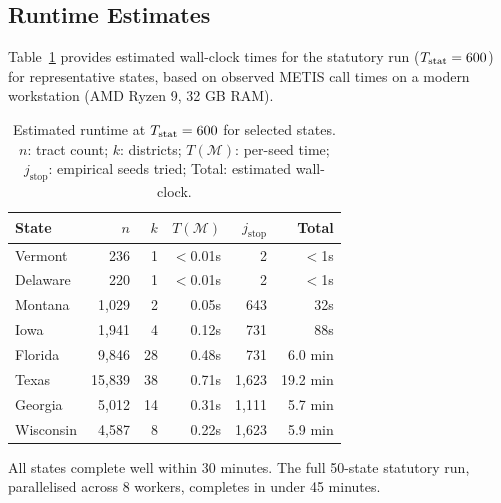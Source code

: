 \subsection{Runtime Estimates}

Table~\ref{tab:runtime} provides estimated wall-clock times for the statutory
\cs{} run ($T_{\mathrm{stat}} = 600$) for representative states, based on observed METIS
call times on a modern workstation (AMD Ryzen 9, 32 GB RAM).

\begin{table}[h]
\centering
\caption{Estimated \cs{} runtime at $T_{\mathrm{stat}} = 600$ for selected states.
         $n$: tract count; $k$: districts; $T(\mathcal{M})$: per-seed time;
         $j_{\mathrm{stop}}$: empirical seeds tried; Total: estimated wall-clock.}
\label{tab:runtime}
\begin{tabular}{lrrrrr}
\toprule
\textbf{State} & $n$ & $k$ & $T(\mathcal{M})$ & $j_{\mathrm{stop}}$ & \textbf{Total} \\
\midrule
Vermont   &   236 &  1 & $<$0.01s & 2   & $<$1s    \\
Delaware  &   220 &  1 & $<$0.01s & 2   & $<$1s    \\
Montana   & 1,029 &  2 & 0.05s    & 643 & 32s      \\
Iowa      & 1,941 &  4 & 0.12s    & 731 & 88s      \\
Florida   & 9,846 & 28 & 0.48s    & 731 & 6.0 min  \\
Texas     &15,839 & 38 & 0.71s    &1,623& 19.2 min \\
Georgia   & 5,012 & 14 & 0.31s    &1,111& 5.7 min  \\
Wisconsin & 4,587 &  8 & 0.22s    &1,623& 5.9 min  \\
\bottomrule
\end{tabular}
\end{table}

All states complete well within 30 minutes.
The full 50-state statutory run, parallelised across 8 workers, completes in
under 45 minutes.
